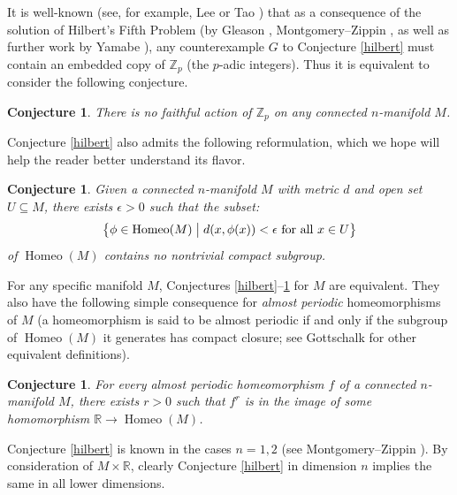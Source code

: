 \documentclass[12pt]{article}
\theoremstyle{plain}
\newtheorem{conjecture}[theorem]{Conjecture}
\theoremstyle{definition}
\theoremstyle{remark}
\numberwithin{equation}{section}
\begin{document}
It is well-known (see, for example, Lee \cite{lee} or Tao \cite{taoblog}) that as a consequence of the solution of Hilbert's Fifth Problem (by Gleason \cite{gleason,gleason2}, Montgomery--Zippin \cite{montgomeryzippin,montgomeryzippin2}, as well as further work by Yamabe \cite{yamabe1,yamabe2}), any counterexample $G$ to Conjecture \ref{hilbert} must contain an embedded copy of $\mathbb Z_p$ (the $p$-adic integers).  Thus it is equivalent to consider the following conjecture.

\begin{conjecture}\label{hs}
There is no faithful action of $\mathbb Z_p$ on any connected $n$-manifold $M$.
\end{conjecture}

Conjecture \ref{hilbert} also admits the following reformulation, which we hope will help the reader better understand its flavor.

\begin{conjecture}\label{homeonscs}
Given a connected $n$-manifold $M$ with metric $d$ and open set $U\subseteq M$, there exists $\epsilon>0$ such that the subset:
\begin{equation}
\left\{\phi\in\operatorname{Homeo}(M)\bigm|d(x,\phi(x))<\epsilon\text{ for all }x\in U\right\}
\end{equation}
of $\operatorname{Homeo}(M)$ contains no nontrivial compact subgroup.
\end{conjecture}

For any specific manifold $M$, Conjectures \ref{hilbert}--\ref{homeonscs} for $M$ are equivalent.  They also have the following simple consequence for \emph{almost periodic} homeomorphisms of $M$ (a homeomorphism is said to be almost periodic if and only if the subgroup of $\operatorname{Homeo}(M)$ it generates has compact closure; see Gottschalk \cite{gottschalk} for other equivalent definitions).

\begin{conjecture}\label{alp}
For every almost periodic homeomorphism $f$ of a connected $n$-manifold $M$, there exists $r>0$ such that $f^r$ is in the image of some homomorphism $\mathbb R\to\operatorname{Homeo}(M)$.
\end{conjecture}

Conjecture \ref{hilbert} is known in the cases $n=1,2$ (see Montgomery--Zippin \cite[pp233,249]{montgomeryzippin2}).  By consideration of $M\times\mathbb R$, clearly Conjecture \ref{hilbert} in dimension $n$ implies the same in all lower dimensions.
\end{document}
